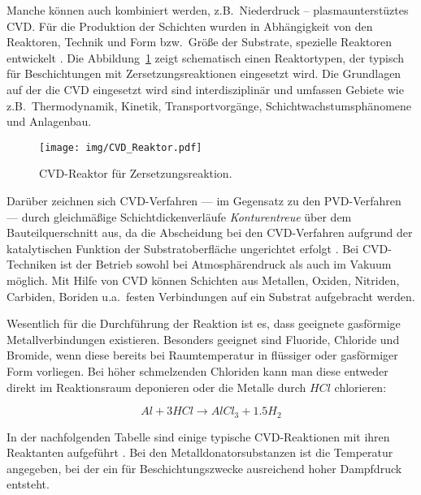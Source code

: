 \documentclass[12pt,a4paper,bibliography=totocnumbered,listof=totocnumbered,fleqn]{scrartcl}
\begin{document}
Manche können auch kombiniert werden, z.B.\ Niederdruck -- plasmaunterstüztes CVD. Für die Produktion der Schichten wurden in Abhängigkeit von den Reaktoren, Technik und Form bzw.\ Größe der Substrate, spezielle Reaktoren entwickelt \citep{pulker1985verschleissschutzschichten}. Die Abbildung~\ref{fig:cvdreaktor} zeigt schematisch einen Reaktortypen, der typisch für Beschichtungen mit Zersetzungsreaktionen eingesetzt wird. Die Grundlagen auf der die CVD eingesetzt wird sind interdisziplinär und umfassen Gebiete wie z.B.\ Thermodynamik, Kinetik, Transportvorgänge, Schichtwachstumsphänomene und Anlagenbau. 

\begin{figure}[h]
\centering
\texttt{[image: img/CVD\_Reaktor.pdf]}
\caption{CVD-Reaktor für Zersetzungsreaktion.}
\label{fig:cvdreaktor}
\end{figure}

Darüber zeichnen sich CVD-Verfahren --- im Gegensatz zu den PVD-Verfahren --- durch gleichmäßige Schichtdickenverläufe \emph{Konturentreue} über dem Bauteilquerschnitt aus, da die Abscheidung bei den CVD-Verfahren aufgrund der katalytischen Funktion der Substratoberfläche ungerichtet erfolgt \citep{bach2005moderne}. Bei CVD-Techniken ist der Betrieb sowohl bei Atmosphärendruck als auch im Vakuum möglich. Mit Hilfe von CVD können Schichten aus Metallen, Oxiden, Nitriden, Carbiden, Boriden u.a.\ festen Verbindungen auf ein Substrat aufgebracht werden.

Wesentlich für die Durchführung der Reaktion ist es, dass geeignete gasförmige Metallverbindungen existieren. Besonders geeignet sind Fluoride, Chloride und Bromide, wenn diese bereits bei Raumtemperatur in flüssiger oder gasförmiger Form vorliegen. Bei höher schmelzenden Chloriden kann man diese entweder direkt im Reaktionsraum deponieren oder die Metalle durch $HCl$ chlorieren:

\begin{equation}
\label{eqn:cvdchloride}
Al + 3HCl \rightarrow AlCl_{3} + 1.5H_{2}
\end{equation}

In der nachfolgenden Tabelle sind einige typische CVD-Reaktionen mit ihren Reaktanten aufgeführt \citep{pulker1985verschleissschutzschichten}. Bei den Metalldonatorsubstanzen ist die Temperatur angegeben, bei der ein für Beschichtungszwecke ausreichend hoher Dampfdruck entsteht.
\end{document}
